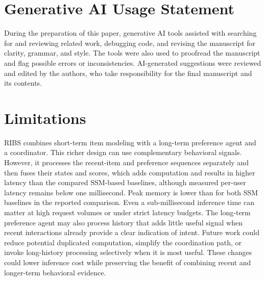 ﻿\documentclass[sigconf,anonymous,review]{acmart}
\begin{document}
\section{Generative AI Usage Statement}
\label{app:genai_usage}
During the preparation of this paper, generative AI tools assisted with searching for and reviewing related work, debugging code, and revising the manuscript for clarity, grammar, and style. The tools were also used to proofread the manuscript and flag possible errors or inconsistencies. AI-generated suggestions were reviewed and edited by the authors, who take responsibility for the final manuscript and its contents.\section{Limitations}
\label{app:limitations}
RIBS combines short-term item modeling with a long-term preference agent and a coordinator. This richer design can use complementary behavioral signals. However, it processes the recent-item and preference sequences separately and then fuses their states and scores, which adds computation and results in higher latency than the compared SSM-based baselines, although measured per-user latency remains below one millisecond. Peak memory is lower than for both SSM baselines in the reported comparison. Even a sub-millisecond inference time can matter at high request volumes or under strict latency budgets. The long-term preference agent may also process history that adds little useful signal when recent interactions already provide a clear indication of intent. Future work could reduce potential duplicated computation, simplify the coordination path, or invoke long-history processing selectively when it is most useful. These changes could lower inference cost while preserving the benefit of combining recent and longer-term behavioral evidence.
\end{document}
